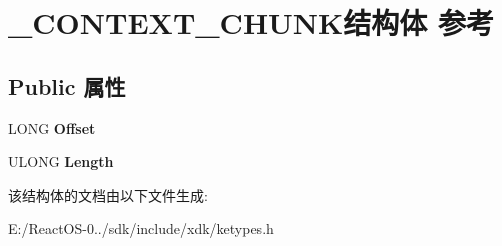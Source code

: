 \hypertarget{struct___c_o_n_t_e_x_t___c_h_u_n_k}{}\section{\+\_\+\+C\+O\+N\+T\+E\+X\+T\+\_\+\+C\+H\+U\+N\+K结构体 参考}
\label{struct___c_o_n_t_e_x_t___c_h_u_n_k}
\subsection*{Public 属性}
\begin{DoxyCompactItemize}
\item 
\mbox{\label{struct___c_o_n_t_e_x_t___c_h_u_n_k_ae8227af074117c70a5cd7ec5262bd1fc}} 
L\+O\+NG {\bfseries Offset}
\item 
\mbox{\label{struct___c_o_n_t_e_x_t___c_h_u_n_k_a3aed53ff022982f2e9e5cc650a62025d}} 
U\+L\+O\+NG {\bfseries Length}
\end{DoxyCompactItemize}


该结构体的文档由以下文件生成\+:\begin{DoxyCompactItemize}
\item 
E\+:/\+React\+O\+S-\/0../sdk/include/xdk/ketypes.\+h\end{DoxyCompactItemize}
